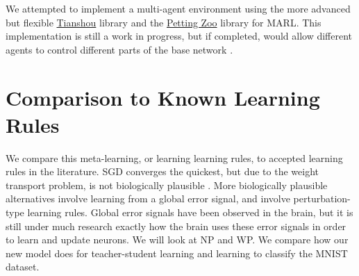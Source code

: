 \documentclass{article}
\begin{document}
We attempted to implement a multi-agent environment using the more advanced but flexible \href{https://github.com/thu-ml/tianshou}{Tianshou} library and the \href{https://pettingzoo.farama.org/}{Petting Zoo} library for MARL. This implementation is still a work in progress, but if completed, would allow different agents to control different parts of the base network \cite{tianshou, pettingzoo}.

\section{Comparison to Known Learning Rules}

We compare this meta-learning, or learning learning rules, to accepted learning rules in the literature. SGD converges the quickest, but due to the weight transport problem, is not biologically plausible \cite{mazzoni1991}. More biologically plausible alternatives involve learning from a global error signal, and involve perturbation-type learning rules. Global error signals have been observed in the brain, but it is still under much research exactly how the brain uses these error signals in order to learn and update neurons. We will look at NP and WP. We compare how our new model does for teacher-student learning and learning to classify the MNIST dataset.
\end{document}
